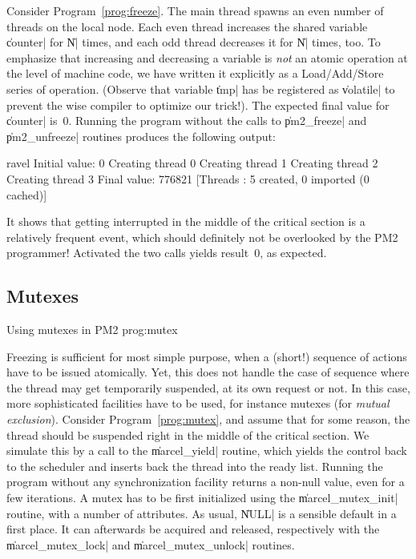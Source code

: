 Consider Program~\ref{prog:freeze}. The main thread spawns an even
number of threads on the local node. Each even thread increases the
shared variable \|counter| for \|N| times, and each odd thread decreases
it for \|N| times, too. To emphasize that increasing and decreasing a
variable is \emph{not} an atomic operation at the level of machine
code, we have written it explicitly as a Load/Add/Store series of
operation. (Observe that variable \|tmp| has be registered as
\|volatile| to prevent the wise compiler to optimize our
trick!). The expected final value for \|counter| is~0.  Running the
program without the calls to \|pm2_freeze| and \|pm2_unfreeze|
routines produces the following output:
\begin{shell}
ravel%
Initial value: 0
Creating thread 0
Creating thread 1
Creating thread 2
Creating thread 3
Final value: 776821
[Threads : 5 created, 0 imported (0 cached)]
\end{shell}
It shows that getting interrupted in the middle of the critical section
is a relatively frequent event, which should definitely not be
overlooked by the PM2 programmer! Activated the two calls yields
result~0, as expected.

\subsection{Mutexes}

 {Using mutexes in PM2}
{prog:mutex}

Freezing is sufficient for most simple purpose, when a (short!)
sequence of actions have to be issued atomically. Yet, this does not
handle the case of sequence where the thread may get temporarily
suspended, at its own request or not. In this case, more sophisticated
facilities have to be used, for instance mutexes (for \emph{mutual
  exclusion}). Consider Program~\ref{prog:mutex}, and assume that for
some reason, the thread should be suspended right in the middle of the
critical section. We simulate this by a call to the \|marcel_yield|
routine, which yields the control back to the scheduler and inserts
back the thread into the ready list. Running the program without any
synchronization facility returns a non-null value, even for a few
iterations. A mutex has to be first initialized using the
\|marcel_mutex_init| routine, with a number of attributes. As usual,
\|NULL| is a sensible default in a first place.  It can afterwards be
acquired and released, respectively with the \|marcel_mutex_lock| and
\|marcel_mutex_unlock| routines.

